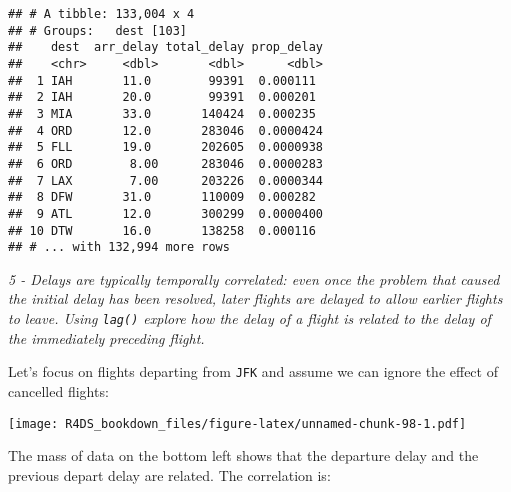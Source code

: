 \documentclass[]{article}
\newenvironment{Shaded}{\begin{snugshade}}{\end{snugshade}}
\newcommand{\KeywordTok}[1]{\textcolor[rgb]{0.13,0.29,0.53}{\textbf{#1}}}
\newcommand{\DataTypeTok}[1]{\textcolor[rgb]{0.13,0.29,0.53}{#1}}
\newcommand{\DecValTok}[1]{\textcolor[rgb]{0.00,0.00,0.81}{#1}}
\newcommand{\StringTok}[1]{\textcolor[rgb]{0.31,0.60,0.02}{#1}}
\newcommand{\OperatorTok}[1]{\textcolor[rgb]{0.81,0.36,0.00}{\textbf{#1}}}
\newcommand{\NormalTok}[1]{#1}
\theoremstyle{definition}
\theoremstyle{definition}
\theoremstyle{definition}
\theoremstyle{remark}
\begin{document}
\begin{verbatim}
## # A tibble: 133,004 x 4
## # Groups:   dest [103]
##    dest  arr_delay total_delay prop_delay
##    <chr>     <dbl>       <dbl>      <dbl>
##  1 IAH       11.0        99391  0.000111 
##  2 IAH       20.0        99391  0.000201 
##  3 MIA       33.0       140424  0.000235 
##  4 ORD       12.0       283046  0.0000424
##  5 FLL       19.0       202605  0.0000938
##  6 ORD        8.00      283046  0.0000283
##  7 LAX        7.00      203226  0.0000344
##  8 DFW       31.0       110009  0.000282 
##  9 ATL       12.0       300299  0.0000400
## 10 DTW       16.0       138258  0.000116 
## # ... with 132,994 more rows
\end{verbatim}

\emph{5 - Delays are typically temporally correlated: even once the
problem that caused the initial delay has been resolved, later flights
are delayed to allow earlier flights to leave. Using \texttt{lag()}
explore how the delay of a flight is related to the delay of the
immediately preceding flight.}

Let's focus on flights departing from \texttt{JFK} and assume we can
ignore the effect of cancelled flights:

\begin{Shaded}
\end{Shaded}

\texttt{[image: R4DS\_bookdown\_files/figure-latex/unnamed-chunk-98-1.pdf]}

The mass of data on the bottom left shows that the departure delay and
the previous depart delay are related. The correlation is:
\end{document}
